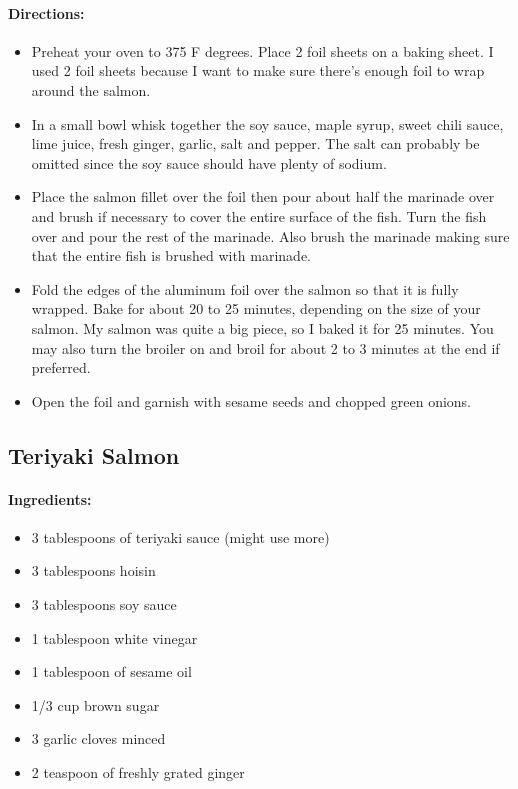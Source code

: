 \documentclass{article}
\begin{document}
\paragraph{Directions:}
\begin{itemize}
  \item Preheat your oven to 375 F degrees. Place 2 foil sheets on a baking sheet. I used 2 foil sheets because I want to make sure there’s enough foil to wrap around the salmon.
  \item In a small bowl whisk together the soy sauce, maple syrup, sweet chili sauce, lime juice, fresh ginger, garlic, salt and pepper. The salt can probably be omitted since the soy sauce should have plenty of sodium.
  \item Place the salmon fillet over the foil then pour about half the marinade over and brush if necessary to cover the entire surface of the fish. Turn the fish over and pour the rest of the marinade. Also brush the marinade making sure that the entire fish is brushed with marinade.
  \item Fold the edges of the aluminum foil over the salmon so that it is fully wrapped. Bake for about 20 to 25 minutes, depending on the size of your salmon. My salmon was quite a big piece, so I baked it for 25 minutes. You may also turn the broiler on and broil for about 2 to 3 minutes at the end if preferred.
  \item Open the foil and garnish with sesame seeds and chopped green onions.
\end{itemize}

\subsection{Teriyaki Salmon}{}

\paragraph{Ingredients:}
\begin{itemize}
	\item 3 tablespoons of teriyaki sauce (might use more)
	\item 3 tablespoons hoisin
	\item 3 tablespoons soy sauce
	\item 1 tablespoon white vinegar
	\item 1 tablespoon of sesame oil
	\item 1/3 cup brown sugar
	\item 3 garlic cloves minced
	\item 2 teaspoon of freshly grated ginger
\end{itemize}
\end{document}
